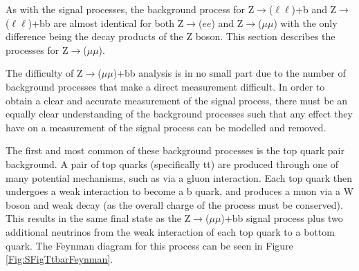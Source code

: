 \documentclass[12pt,a4paper,epsf,portrait,times,epsfig]{article}
\begin{document}
		As with the signal processes, the background process for Z$\rightarrow$($\ell\ell$)+b and Z$\rightarrow$($\ell\ell$)+bb are almost identical for both Z$\rightarrow$($ee$) and Z$\rightarrow$($\mu\mu$) with the only difference being the decay products of the Z boson. This section describes the processes for Z$\rightarrow$($\mu\mu$). \par
		
		The difficulty of Z$\rightarrow$($\mu\mu$)+bb analysis is in no small part due to the number of background processes that make a direct measurement difficult. In order to obtain a clear and accurate measurement of the signal process, there must be an equally clear understanding of the background processes such that any effect they have on a measurement of the signal process can be modelled and removed. \par
		
		The first and most common of these background processes is the top quark pair background. A pair of top quarks (specifically tt) are produced through one of many potential mechanisms, such as via a gluon interaction. Each top quark then undergoes a weak interaction to become a b quark, and produces a muon via a W boson and weak decay (as the overall charge of the process must be conserved). This results in the same final state as the Z$\rightarrow$($\mu\mu$)+bb signal process plus two additional neutrinos from the weak interaction of each top quark to a bottom quark. The Feynman diagram for this process can be seen in Figure \ref{Fig:SFigTtbarFeynman}. \par
		
\end{document}
